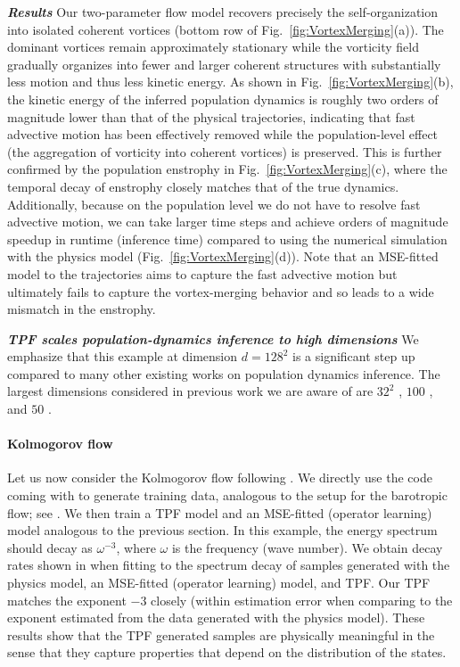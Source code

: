 \documentclass{article}
\theoremstyle{definition}
\theoremstyle{plain}
\theoremstyle{definition}
\theoremstyle{remark}
\begin{document}
\textbf{\emph{Results}} Our two-parameter flow model recovers precisely the self-organization into isolated coherent vortices (bottom row of Fig.~\ref{fig:VortexMerging}(a)). The dominant vortices remain approximately stationary while the vorticity field gradually organizes into fewer and larger coherent structures with substantially less motion and thus less kinetic energy. As shown in Fig.~\ref{fig:VortexMerging}(b), the kinetic energy of the inferred population dynamics is roughly two orders of magnitude lower than that of the physical trajectories, indicating that fast advective motion has been effectively removed while the population-level effect (the aggregation of vorticity into coherent vortices) is preserved. This is further confirmed by the population enstrophy in Fig.~\ref{fig:VortexMerging}(c), where the temporal decay of enstrophy closely matches that of the true dynamics. Additionally, because on the population level we do not have to resolve fast advective motion, we can take larger time steps and achieve orders of magnitude speedup in runtime (inference time) compared to using the numerical simulation with the physics model  (Fig.~\ref{fig:VortexMerging}(d)). Note that an MSE-fitted model to the trajectories aims to capture the fast advective motion but ultimately fails to capture the vortex-merging behavior and so leads to a wide mismatch in the enstrophy. 

\textbf{\emph{TPF scales population-dynamics inference to high dimensions}} We emphasize that this example at dimension $d = 128^2$ is a significant step up  compared to many other existing works on population dynamics inference. The largest dimensions considered in previous work we are aware of are $32^2$ \cite{neklyudov_action_2023, blickhan2025dicediscreteinversecontinuity}, $100$ \cite{chen_deep_2023, persiianov_learning_2025}, and $50$ \cite{terpin_2024_learning, petrovic_curly_2025}.

\paragraph{Kolmogorov flow} Let us now consider the Kolmogorov flow following \cite{doi:10.1073/pnas.2101784118}. We directly use the code coming with \cite{doi:10.1073/pnas.2101784118} to generate training data, analogous to the setup for the barotropic flow; see . We then train a TPF model and an MSE-fitted (operator learning) model analogous to the previous section. In this example, the energy spectrum should decay as $\omega^{-3}$, where $\omega$ is the frequency (wave number). We obtain decay rates shown in   
when fitting to the spectrum decay of samples generated with the physics model, an MSE-fitted (operator learning) model, and TPF. Our TPF matches the exponent $-3$ closely (within estimation error when comparing to the exponent estimated from the data generated with the physics model). These results show that the TPF generated samples are physically meaningful in the sense that they capture properties that depend on the distribution of the states. 
\end{document}
